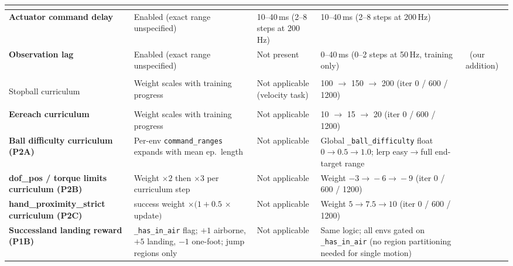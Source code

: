 \documentclass[a4paper,10pt]{article}
\newcommand{\cmark}{\ding{51}}   %
\begin{document}
{\begin{longtable}{>{\bfseries}p{3.6cm} p{3.4cm} p{3.4cm} p{3.4cm} p{1.2cm}}
\midrule
\rowcolor{sectionbg}
\multicolumn{5}{l}{\textcolor{white}{\textbf{Delays}}} \\
\midrule

Actuator command delay
  & Enabled (exact range unspecified)
  & 10--40\,ms (2--8 steps at 200\,Hz)
  & 10--40\,ms (2--8 steps at 200\,Hz)
  & \cmark \\

Observation lag
  & Enabled (exact range unspecified)
  & Not present
  & 0--40\,ms (0--2 steps at 50\,Hz, training only)
  & \cmark\ (our addition) \\

\midrule
\rowcolor{sectionbg}
\multicolumn{5}{l}{\textcolor{white}{\textbf{Curriculum \& training phases}}} \\
\midrule

Stopball curriculum
  & Weight scales with training progress
  & Not applicable (velocity task)
  & 100 $\to$ 150 $\to$ 200 \newline (iter 0 / 600 / 1200)
  & \cmark \\

Eereach curriculum
  & Weight scales with training progress
  & Not applicable
  & 10 $\to$ 15 $\to$ 20 \newline (iter 0 / 600 / 1200)
  & \cmark \\

Ball difficulty curriculum (P2A)
  & Per-env \texttt{command\_ranges} expands with mean ep.\ length
  & Not applicable
  & Global \texttt{\_ball\_difficulty} float $0\!\to\!0.5\!\to\!1.0$; \newline lerp easy$\to$full end-target range
  & \cmark \\

dof\_pos / torque limits curriculum (P2B)
  & Weight $\times 2$ then $\times 3$ per curriculum step
  & Not applicable
  & Weight $-3\!\to\!-6\!\to\!-9$ \newline (iter 0 / 600 / 1200)
  & \cmark \\

hand\_proximity\_strict curriculum (P2C)
  & success weight $\times (1 + 0.5\,\times\,$update$)$
  & Not applicable
  & Weight $5\!\to\!7.5\!\to\!10$ \newline (iter 0 / 600 / 1200)
  & \cmark \\

Successland landing reward (P1B)
  & \texttt{\_has\_in\_air} flag; $+1$ airborne, $+5$ landing, $-1$ one-foot; jump regions only
  & Not applicable
  & Same logic; all envs gated on \texttt{\_has\_in\_air} (no region partitioning needed for single motion)
  & \cmark \\


\end{longtable}}
\end{document}
